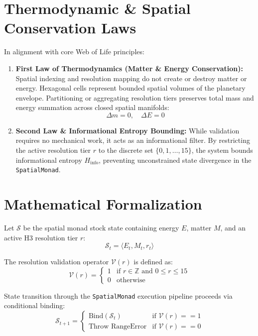 \documentclass[11pt, a4paper]{article}
\begin{document}
\section{Thermodynamic \& Spatial Conservation Laws}
In alignment with core Web of Life principles:
\begin{enumerate}
    \item \textbf{First Law of Thermodynamics (Matter \& Energy Conservation):} Spatial indexing and resolution mapping do not create or destroy matter or energy. Hexagonal cells represent bounded spatial volumes of the planetary envelope. Partitioning or aggregating resolution tiers preserves total mass and energy summation across closed spatial manifolds:
    \begin{equation}
        \Delta m = 0, \quad \Delta E = 0
    \end{equation}
    \item \textbf{Second Law \& Informational Entropy Bounding:} While validation requires no mechanical work, it acts as an informational filter. By restricting the active resolution tier $r$ to the discrete set $\{0, 1, \dots, 15\}$, the system bounds informational entropy $H_{\text{info}}$, preventing unconstrained state divergence in the \texttt{SpatialMonad}.
\end{enumerate}

\section{Mathematical Formalization}
Let $\mathcal{S}$ be the spatial monad stock state containing energy $E$, matter $M$, and an active H3 resolution tier $r$:
\begin{equation}
    \mathcal{S}_t = \langle E_t, M_t, r_t \rangle
\end{equation}

The resolution validation operator $\mathcal{V}(r)$ is defined as:
\begin{equation}
    \mathcal{V}(r) = \begin{cases} 
    1 & \text{if } r \in \mathbb{Z} \text{ and } 0 \le r \le 15 \\ 
    0 & \text{otherwise} 
    \end{cases}
\end{equation}

State transition through the \texttt{SpatialMonad} execution pipeline proceeds via conditional binding:
\begin{equation}
    \mathcal{S}_{t+1} = \begin{cases} 
    \text{Bind}(\mathcal{S}_t) & \text{if } \mathcal{V}(r) == 1 \\ 
    \text{Throw } \text{RangeError} & \text{if } \mathcal{V}(r) == 0 
    \end{cases}
\end{equation}
\end{document}
